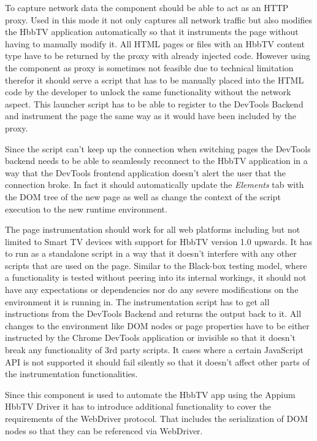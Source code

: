 To capture network data the component should be able to act as an HTTP proxy. Used in this mode it not only captures all network traffic but also modifies the HbbTV application automatically so that it instruments the page without having to manually modify it. All HTML pages or files with an HbbTV content type have to be returned by the proxy with already injected code. However using the component as proxy is sometimes not feasible due to technical limitation therefor it should serve a script that has to be manually placed into the HTML code by the developer to unlock the same functionality without the network aspect. This launcher script has to be able to register to the DevTools Backend and instrument the page the same way as it would have been included by the proxy.

Since the script can't keep up the connection when switching pages the DevTools backend needs to be able to seamlessly reconnect to the HbbTV application in a way that the DevTools frontend application doesn't alert the user that the connection broke. In fact it should automatically update the \textit{Elements} tab with the DOM tree of the new page as well as change the context of the script execution to the new runtime environment.

The page instrumentation should work for all web platforms including but not limited to Smart TV devices with support for HbbTV version 1.0 upwards. It has to run as a standalone script in a way that it doesn't interfere with any other scripts that are used on the page. Similar to the Black-box testing model, where a functionality is tested without peering into its internal workings, it should not have any expectations or dependencies nor do any severe modifications on the environment it is running in. The instrumentation script has to get all instructions from the DevTools Backend and returns the output back to it. All changes to the environment like DOM nodes or page properties have to be either instructed by the Chrome DevTools application or invisible so that it doesn't break any functionality of 3rd party scripts. It cases where a certain JavaScript API is not supported it should fail silently so that it doesn't affect other parts of the instrumentation functionalities.

Since this component is used to automate the HbbTV app using the Appium HbbTV Driver it has to introduce additional functionality to cover the requirements of the WebDriver protocol. That includes the serialization of DOM nodes so that they can be referenced via WebDriver.


